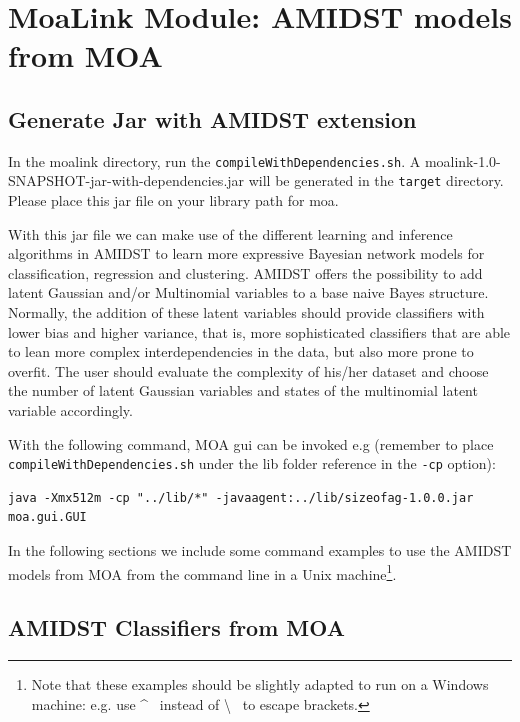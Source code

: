 \chapter{MoaLink Module: AMIDST models from MOA}\label{sec:codeExamples}

\section{Generate Jar with AMIDST extension}
In the moalink directory, run the \texttt{compileWithDependencies.sh}. A moalink-1.0-SNAPSHOT-jar-with-dependencies.jar will be generated in the \texttt{target} directory. Please place this jar file on your library path for moa. 

With this jar file we can make use of the different learning and inference algorithms in AMIDST to learn more expressive Bayesian network models for classification, regression and clustering. AMIDST offers the possibility to add latent Gaussian and/or Multinomial variables to a base naive Bayes structure. Normally, the addition of these latent variables should provide classifiers with lower bias and higher variance, that is, more sophisticated classifiers that are able to lean more complex interdependencies in the data, but also more prone to overfit. The user should evaluate the complexity of his/her dataset and choose the number of latent Gaussian variables and states of the multinomial latent variable accordingly.

With the following command, MOA gui can be invoked e.g (remember to place \texttt{compileWithDependencies.sh} under the lib folder reference in the \verb'-cp' option):

\begin{verbatim}
java -Xmx512m -cp "../lib/*" -javaagent:../lib/sizeofag-1.0.0.jar
moa.gui.GUI
\end{verbatim}

In the following sections we include some command examples to use the AMIDST models from MOA from the command line in a Unix machine\footnote{Note that these examples should be slightly adapted to run on a Windows machine: e.g. use \textasciicircum~ instead of \textbackslash~ to escape brackets.}.

\section{AMIDST Classifiers from MOA}

